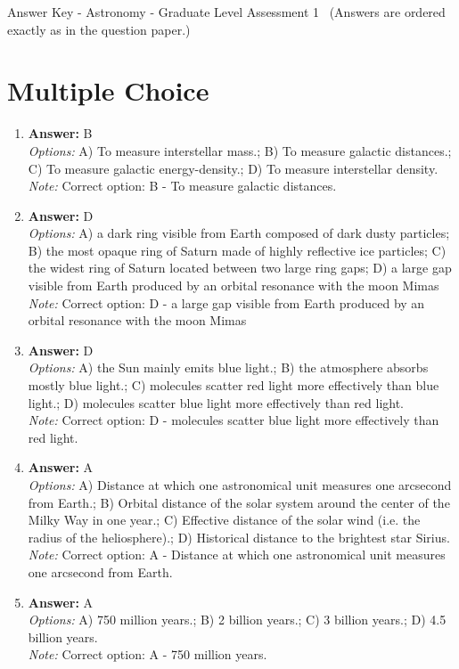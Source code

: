 \documentclass[12pt]{article}
\begin{document}
\begin{center}
Answer Key - Astronomy - Graduate Level Assessment 1 \
\small (Answers are ordered exactly as in the question paper.)
\end{center}

\section*{Multiple Choice}
\begin{enumerate}[label=\arabic*.]
\item \textbf{Answer:} B
\\ \textit{Options:} A) To measure interstellar mass.; B) To measure galactic distances.; C) To measure galactic energy-density.; D) To measure interstellar density.
\\ \textit{Note:} Correct option: B - To measure galactic distances.
\item \textbf{Answer:} D
\\ \textit{Options:} A) a dark ring visible from Earth composed of dark dusty particles; B) the most opaque ring of Saturn made of highly reflective ice particles; C) the widest ring of Saturn located between two large ring gaps; D) a large gap visible from Earth produced by an orbital resonance with the moon Mimas
\\ \textit{Note:} Correct option: D - a large gap visible from Earth produced by an orbital resonance with the moon Mimas
\item \textbf{Answer:} D
\\ \textit{Options:} A) the Sun mainly emits blue light.; B) the atmosphere absorbs mostly blue light.; C) molecules scatter red light more effectively than blue light.; D) molecules scatter blue light more effectively than red light.
\\ \textit{Note:} Correct option: D - molecules scatter blue light more effectively than red light.
\item \textbf{Answer:} A
\\ \textit{Options:} A) Distance at which one astronomical unit measures one arcsecond from Earth.; B) Orbital distance of the solar system around the center of the Milky Way in one year.; C) Effective distance of the solar wind (i.e. the radius of the heliosphere).; D) Historical distance to the brightest star Sirius.
\\ \textit{Note:} Correct option: A - Distance at which one astronomical unit measures one arcsecond from Earth.
\item \textbf{Answer:} A
\\ \textit{Options:} A) 750 million years.; B) 2 billion years.; C) 3 billion years.; D) 4.5 billion years.
\\ \textit{Note:} Correct option: A - 750 million years.
\end{enumerate}
\end{document}
